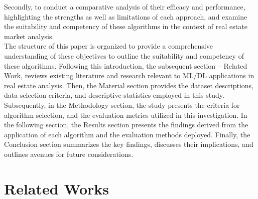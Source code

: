 \documentclass[conference]{IEEEtran}
\begin{document}
Secondly, to conduct a comparative analysis of their efficacy and performance, highlighting the strengths as well as limitations of each approach, and examine the suitability and competency of these algorithms in the context of real estate market analysis. \\
The structure of this paper is organized to provide a comprehensive understanding of these objectives to outline the suitability and competency of these algorithms. Following this introduction, the subsequent section – Related Work, reviews existing literature and research relevant to ML/DL applications in real estate analysis. Then, the Material section provides the dataset descriptions, data selection criteria, and descriptive statistics employed in this study. Subsequently, in the Methodology section, the study presents the criteria for algorithm selection, and the evaluation metrics utilized in this investigation. In the following section, the Results section presents the findings derived from the application of each algorithm and the evaluation methods deployed. Finally, the Conclusion section summarizes the key findings, discusses their implications, and outlines avenues for future considerations. 

\section{\textbf{Related Works}}
\end{document}
